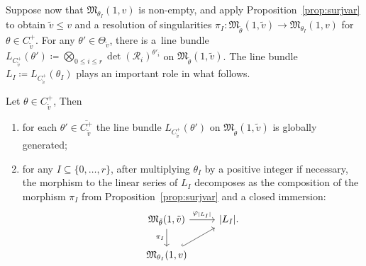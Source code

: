 Suppose now that $\mathfrak{M}_{\theta_I}(1,v)$ is non-empty, and apply Proposition~\ref{prop:surjvar} to obtain $\tilde{v}\leq v$ and a resolution of singularities $\pi_{I}\colon \mathfrak{M}_{\widetilde{\theta}}(1,\widetilde{v})\to \mathfrak{M}_{\theta_I}(1,v)$ for $\theta\in C^{+}_{\tilde{v}}$. For any $\theta'\in \Theta_{{\tilde{v}}}$, there is a~line bundle $L_{C^{+}_{{\tilde{v}}}}(\theta')\coloneqq \bigotimes_{0\leq i\leq r} \det(\mathcal{R}_i)^{\theta'_i}$ on $\mathfrak{M}_{\tilde{\theta}}(1,{\tilde{v}})$. The line bundle $L_I\coloneqq L_{C^{+}_{\tilde{v}}}(\theta_I)$ plays an important role in what follows.
\begin{Lemma}\label{lem:factorimm}
Let $\theta\in C^{+}_{\tilde{v}}$, Then
 \begin{enumerate}\itemsep=0pt
 \item[$1)$] for each $\theta' \in \overline{C^{+}_{\tilde{v}}}$ the line bundle $L_{C^{+}_{\tilde{v}}}(\theta')$ on $\mathfrak{M}_{\tilde{\theta}}(1,{\tilde{v}})$ is globally generated;
 \item[$2)$] for any $I\subseteq \{0,\dots, r\}$, after multiplying $\theta_I$ by a positive integer if necessary, the morphism to the linear series of $L_I$ decomposes as the composition of the
 morphism $\pi_I$ from Proposition~{\rm \ref{prop:surjvar}} and a closed immersion:
 \begin{equation*}
 \begin{tikzcd}
 \mathfrak{M}_{\tilde{\theta}}(1,\tilde{v}) \ar[d,swap,"{\pi_I}"]\ar[r,"\varphi_{\vert L_I\vert}"] & \vert L_I\vert. \\ \mathfrak{M}_{\theta_I}(1,v)\ar[ur,hook] &
 \end{tikzcd}
 \end{equation*}
 \end{enumerate}
 \end{Lemma}
